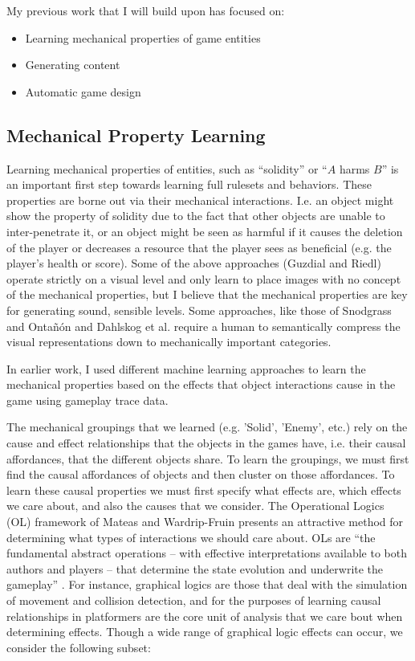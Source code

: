 \documentclass[a4paper]{article}
\begin{document}
My previous work that I will build upon has focused on:

\begin{itemize}
\item Learning mechanical properties of game entities
\item Generating content
\item Automatic game design
\end{itemize}

\subsection{Mechanical Property Learning}
\label{sec:mechanical_property_learning}
Learning mechanical properties of entities, such as ``solidity'' or ``$A$ harms $B$'' is an important first step towards learning full rulesets and behaviors. These properties are borne out via their mechanical interactions.  I.e. an object might show the property of solidity due to the fact that other objects are unable to inter-penetrate it, or an object might be seen as harmful if it causes the deletion of the player or decreases a resource that the player sees as beneficial (e.g. the player's health or score).  Some of the above approaches (Guzdial and Riedl) operate strictly on a visual level and only learn to place images with no concept of the mechanical properties, but I believe that the mechanical properties are key for generating sound, sensible levels.  Some approaches, like those of Snodgrass and Onta{\~n}{\'o}n and Dahlskog et al. require a human to semantically compress the visual representations down to mechanically important categories.  

In earlier work, I used different machine learning approaches to  learn the mechanical properties based on the effects that object interactions cause in the game using gameplay trace data. 

 The mechanical groupings that we learned (e.g. 'Solid', 'Enemy', etc.) rely on the cause and effect relationships that the objects in the games have, i.e. their causal affordances, that the different objects share.  To learn the groupings, we must first find the causal affordances of objects and then cluster on those affordances.  To learn these causal properties we must first specify what effects are, which effects we care about, and also the causes that we consider.  The Operational Logics (OL) framework of Mateas and Wardrip-Fruin \cite{OperationalLogics} presents an attractive method for determining what types of interactions we should care about.  OLs are ``the fundamental abstract operations -- with effective interpretations available to both authors and players -- that determine the state evolution and underwrite the gameplay'' \cite{OperationalLogics}.  For instance, graphical logics are those that deal with the simulation of movement and collision detection, and for the purposes of learning causal relationships in platformers are the core unit of analysis that we care bout when determining effects. Though a wide range of graphical logic effects can occur, we consider the following subset:
 
\end{document}
